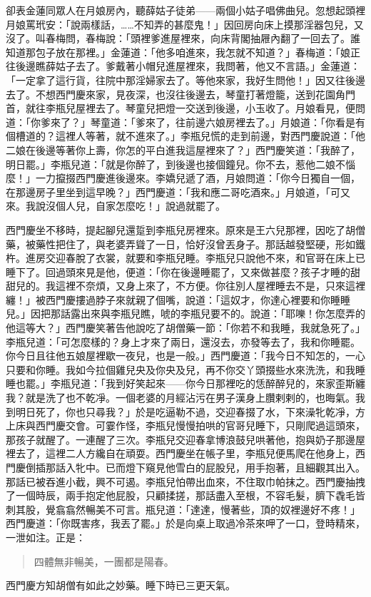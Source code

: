 卻表金蓮同眾人在月娘房內，聽薛姑子徒弟——兩個小姑子唱佛曲兒。忽想起頭裡月娘罵玳安：「說兩樣話，……不知弄的甚麼鬼！」因回房向床上摸那淫器包兒，又沒了。叫春梅問，春梅說：「頭裡爹進屋裡來，向床背閣抽屜內翻了一回去了。誰知道那包子放在那裡。」金蓮道：「他多咱進來，我怎就不知道？」春梅道：「娘正往後邊瞧薛姑子去了。爹戴著小帽兒進屋裡來，我問著，他又不言語。」金蓮道：「一定拿了這行貨，往院中那淫婦家去了。等他來家，我好生問他！」因又往後邊去了。不想西門慶來家，見夜深，也沒往後邊去，琴童打著燈籠，送到花園角門首，就往李瓶兒屋裡去了。琴童兒把燈一交送到後邊，小玉收了。月娘看見，便問道：「你爹來了？」琴童道：「爹來了，往前邊六娘房裡去了。」月娘道：「你看是有個槽道的？這裡人等著，就不進來了。」李瓶兒慌的走到前邊，對西門慶說道：「他二娘在後邊等著你上壽，你怎的平白進我這屋裡來了？」西門慶笑道：「我醉了，明日罷。」李瓶兒道：「就是你醉了，到後邊也接個鐘兒。你不去，惹他二娘不惱麼！」一力攛掇西門慶進後邊來。李嬌兒遞了酒，月娘問道：「你今日獨自一個，在那邊房子里坐到這早晚？」西門慶道：「我和應二哥吃酒來。」月娘道，「可又來。我說沒個人兒，自家怎麼吃！」說過就罷了。

西門慶坐不移時，提起腳兒還踅到李瓶兒房裡來。原來是王六兒那裡，因吃了胡僧藥，被藥性把住了，與老婆弄聳了一日，恰好沒曾丟身子。那話越發堅硬，形如鐵杵。進房交迎春脫了衣裳，就要和李瓶兒睡。李瓶兒只說他不來，和官哥在床上已睡下了。回過頭來見是他，便道：「你在後邊睡罷了，又來做甚麼？孩子才睡的甜甜兒的。我這裡不奈煩，又身上來了，不方便。你往別人屋裡睡去不是，只來這裡纏！」被西門慶摟過脖子來就親了個嘴，說道：「這奴才，你達心裡要和你睡睡兒。」因把那話露出來與李瓶兒瞧，唬的李瓶兒要不的。說道：「耶嚛！你怎麼弄的他這等大？」西門慶笑著告他說吃了胡僧藥一節：「你若不和我睡，我就急死了。」李瓶兒道：「可怎麼樣的？身上才來了兩日，還沒去，亦發等去了，我和你睡罷。你今日且往他五娘屋裡歇一夜兒，也是一般。」西門慶道：「我今日不知怎的，一心只要和你睡。我如今拉個雞兒央及你央及兒，再不你交丫頭掇些水來洗洗，和我睡睡也罷。」李瓶兒道：「我到好笑起來——你今日那裡吃的恁醉醉兒的，來家歪斯纏我？就是洗了也不乾凈。一個老婆的月經沾污在男子漢身上臢剌剌的，也晦氣。我到明日死了，你也只尋我？」於是吃逼勒不過，交迎春掇了水，下來澡牝乾凈，方上床與西門慶交會。可霎作怪，李瓶兒慢慢拍哄的官哥兒睡下，只剛爬過這頭來，那孩子就醒了。一連醒了三次。李瓶兒交迎春拿博浪鼓兒哄著他，抱與奶子那邊屋裡去了，這裡二人方纔自在頑耍。西門慶坐在帳子里，李瓶兒便馬爬在他身上，西門慶倒插那話入牝中。已而燈下窺見他雪白的屁股兒，用手抱著，且細觀其出入。那話已被吞進小截，興不可遏。李瓶兒怕帶出血來，不住取巾帕抹之。西門慶抽拽了一個時辰，兩手抱定他屁股，只顧揉搓，那話盡入至根，不容毛髮，臍下毳毛皆刺其股，覺翕翕然暢美不可言。瓶兒道：「達達，慢著些，頂的奴裡邊好不疼！」西門慶道：「你既害疼，我丟了罷。」於是向桌上取過冷茶來呷了一口，登時精來，一泄如注。正是：
\begin{quote}
四體無非暢美，一團都是陽春。
\end{quote}
西門慶方知胡僧有如此之妙藥。睡下時已三更天氣。

